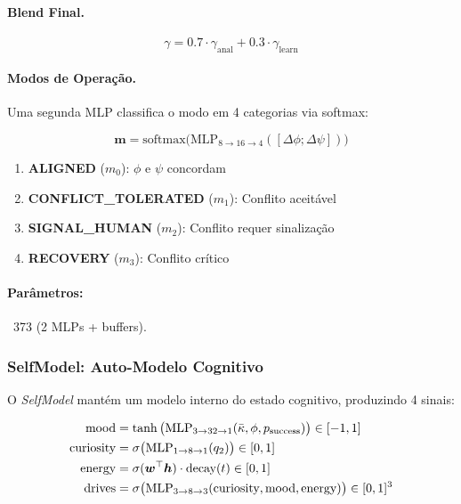 \paragraph{Blend Final.}
\begin{equation}
    \gamma = 0.7 \cdot \gamma_{\text{anal}} + 0.3 \cdot \gamma_{\text{learn}}
\end{equation}

\paragraph{Modos de Opera\c{c}\~ao.}
Uma segunda MLP classifica o modo em 4 categorias via softmax:

\begin{equation}
    \bm{m} = \text{softmax}\big(\text{MLP}_{8 \to 16 \to 4}([\Delta\phi; \Delta\psi])\big)
\end{equation}

\begin{enumerate}
    \item \textbf{ALIGNED} ($m_0$): $\phi$ e $\psi$ concordam
    \item \textbf{CONFLICT\_TOLERATED} ($m_1$): Conflito aceit\'avel
    \item \textbf{SIGNAL\_HUMAN} ($m_2$): Conflito requer sinaliza\c{c}\~ao
    \item \textbf{RECOVERY} ($m_3$): Conflito cr\'itico
\end{enumerate}

\paragraph{Par\^ametros:} ~373 (2 MLPs + buffers).

\subsubsection{SelfModel: Auto-Modelo Cognitivo}
\label{sec:selfmodel}

O \textit{SelfModel} mant\'em um modelo interno do estado cognitivo,
produzindo 4 sinais:

\begin{align}
    \text{mood} &= \tanh\big(\text{MLP}_{3 \to 32 \to 1}(\bar{\kappa}, \phi, p_{\text{success}})\big) \in [-1, 1] \\
    \text{curiosity} &= \sigma\big(\text{MLP}_{1 \to 8 \to 1}(q_2)\big) \in [0, 1] \\
    \text{energy} &= \sigma(\bm{w}^\top \bm{h}) \cdot \text{decay}(t) \in [0, 1] \\
    \text{drives} &= \sigma\big(\text{MLP}_{3 \to 8 \to 3}(\text{curiosity}, \text{mood}, \text{energy})\big) \in [0, 1]^3
\end{align}

